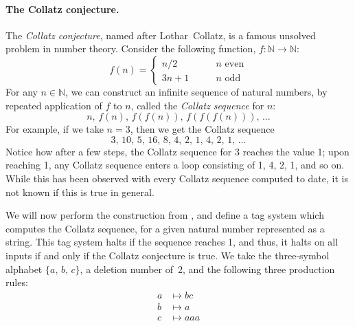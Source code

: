\documentclass[../generics]{subfiles}
\begin{document}
\paragraph{The Collatz conjecture.} The \emph{Collatz conjecture}, named after Lothar~Collatz, is a famous unsolved problem in number theory. Consider the following function, $f\colon\mathbb{N}\rightarrow\mathbb{N}$:
\[
f(n) = \begin{cases}
n/2 &\qquad \mbox{$n$ even}\\
3n+1 &\qquad \mbox{$n$ odd}
\end{cases}
\]
For any $n\in\mathbb{N}$, we can construct an infinite sequence of natural numbers, by repeated application of $f$ to $n$, called the \emph{Collatz sequence} for $n$:
\[n,\,f(n),\,f(f(n)),\,f(f(f(n))),\,\ldots\]
For example, if we take $n=3$, then we get the Collatz sequence
\[3,\,10,\,5,\,16,\,8,\,4,\,2,\,1,\,4,\,2,\,1,\,\ldots\]
Notice how after a few steps, the Collatz sequence for 3 reaches the value 1; upon reaching 1, any Collatz sequence enters a loop consisting of 1, 4, 2, 1, and so on. While this has been observed with every Collatz sequence computed to date, it is not known if this is true in general.

We will now perform the construction from \cite{collatztag}, and define a tag system which computes the Collatz sequence, for a given natural number represented as a string. This tag system halts if the sequence reaches 1, and thus, it halts on all inputs if and only if the Collatz conjecture is true. We take the three-symbol alphabet $\{a,\,b,\,c\}$, a deletion number of~2, and the following three production rules:
\begin{align*}
a &\mapsto bc\\
b &\mapsto a\\
c &\mapsto aaa
\end{align*}
\end{document}
